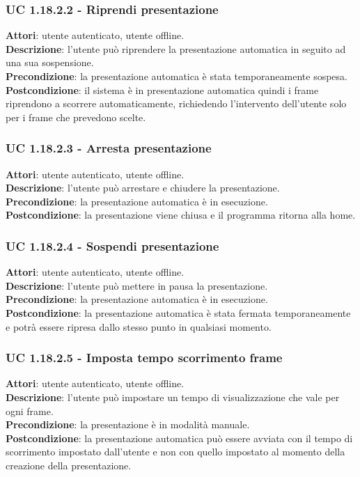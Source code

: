	\subsubsection{UC 1.18.2.2 - Riprendi presentazione}{
		\label{uc1.18.2.2}
		\textbf{Attori}: utente autenticato, utente offline. \\
		\textbf{Descrizione}: l'utente può riprendere la presentazione automatica in seguito ad una sua sospensione. \\
		\textbf{Precondizione}: la presentazione automatica è stata temporaneamente sospesa.	\\
		\textbf{Postcondizione}: il sistema è in presentazione automatica quindi i frame riprendono a scorrere automaticamente, richiedendo l'intervento dell'utente solo per i frame che prevedono scelte.
	}
	\subsubsection{UC 1.18.2.3 - Arresta presentazione}{
		\label{uc1.18.2.3}
		\textbf{Attori}: utente autenticato, utente offline. \\
		\textbf{Descrizione}: l'utente può arrestare e chiudere la presentazione. \\
		\textbf{Precondizione}: la presentazione automatica è in esecuzione.	\\
		\textbf{Postcondizione}: la presentazione viene chiusa e il programma ritorna alla home.
	}
	\subsubsection{UC 1.18.2.4 - Sospendi presentazione}{
		\label{uc1.18.2.4}
		\textbf{Attori}: utente autenticato, utente offline. \\
		\textbf{Descrizione}: l'utente può mettere in pausa la presentazione. \\
		\textbf{Precondizione}: la presentazione automatica è in esecuzione.	\\
		\textbf{Postcondizione}: la presentazione automatica è stata fermata temporaneamente e potrà essere ripresa dallo stesso punto in qualsiasi momento.
	}
	\subsubsection{UC 1.18.2.5 - Imposta tempo scorrimento frame}{
		\label{uc1.18.2.5}
		\textbf{Attori}: utente autenticato, utente offline. \\
		\textbf{Descrizione}: l'utente può impostare un tempo di visualizzazione che vale per ogni frame. \\
		\textbf{Precondizione}: la presentazione è in modalità manuale.	\\
		\textbf{Postcondizione}: la presentazione automatica può essere avviata con il tempo di scorrimento impostato dall'utente e non con quello impostato al momento della creazione della presentazione.
	}
